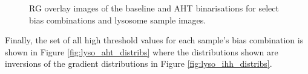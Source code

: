 \begin{figure}[h!]
	\caption{RG overlay images of the baseline and AHT binarisations for select bias combinations and lysosome sample images.}
	\label{fig:lyso_aht_select}
\end{figure}

Finally, the set of all high threshold values for each sample's bias combination is shown in Figure \ref{fig:lyso_aht_distribs} where the distributions shown are inversions of the gradient distributions in Figure \ref{fig:lyso_ihh_distribs}. 

